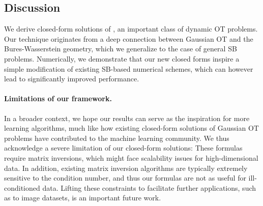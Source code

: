 \subsection{Discussion}
 We derive closed-form solutions of , an important class of dynamic \acrshort{OT} problems. Our technique originates from a deep connection between Gaussian \acrshort{OT} and the Bures-Wasserstein geometry, which we generalize to the case of general \acrshort{SB} problems. Numerically, we demonstrate that our new closed forms inspire a simple modification of existing \acrshort{SB}-based numerical schemes, which can however lead to significantly improved performance.

\paragraph{Limitations of our framework.}
 In a broader context, we hope our results can serve as the inspiration for more learning algorithms, much like how existing closed-form solutions of Gaussian \acrshort{OT} problems have contributed to the machine learning community. We thus acknowledge a severe limitation of our closed-form solutions: These formulas require matrix inversions, which might face scalability issues for high-dimensional data. In addition, existing matrix inversion algorithms are typically extremely sensitive to the condition number, and thus our formulas are not as useful for ill-conditioned data. Lifting these constraints to facilitate further applications, such as to image datasets, is an important future work.
